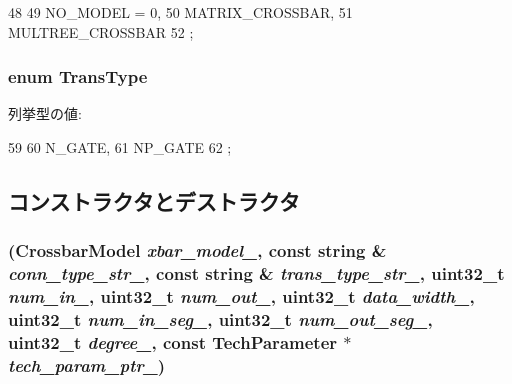 \begin{DoxyCode}
48     {
49       NO_MODEL = 0,
50       MATRIX_CROSSBAR,
51       MULTREE_CROSSBAR
52     };
\end{DoxyCode}
\hypertarget{classCrossbar_acee593b112f4fc85f850631b9c6aaae9}{
\subsubsection[{TransType}]{\setlength{\rightskip}{0pt plus 5cm}enum {\bf TransType}}}
\label{classCrossbar_acee593b112f4fc85f850631b9c6aaae9}
\begin{Desc}
\item[列挙型の値: ]\par
\begin{description}
\item[{\em 
\hypertarget{classCrossbar_acee593b112f4fc85f850631b9c6aaae9a1519be35cfe33e8259c08e59f87358b8}{
N\_\-GATE}
\label{classCrossbar_acee593b112f4fc85f850631b9c6aaae9a1519be35cfe33e8259c08e59f87358b8}
}]\item[{\em 
\hypertarget{classCrossbar_acee593b112f4fc85f850631b9c6aaae9a90021e7e91707771d3c648f4b4c1a1ba}{
NP\_\-GATE}
\label{classCrossbar_acee593b112f4fc85f850631b9c6aaae9a90021e7e91707771d3c648f4b4c1a1ba}
}]\end{description}
\end{Desc}




\begin{DoxyCode}
59     {
60       N_GATE,
61       NP_GATE
62     };
\end{DoxyCode}


\subsection{コンストラクタとデストラクタ}
\hypertarget{classCrossbar_a7173a2d0073951cf449b0487c70479d3}{
\subsubsection[{Crossbar}]{ ({\bf CrossbarModel} {\em xbar\_\-model\_\-}, \/  const string \& {\em conn\_\-type\_\-str\_\-}, \/  const string \& {\em trans\_\-type\_\-str\_\-}, \/  {\bf uint32\_\-t} {\em num\_\-in\_\-}, \/  {\bf uint32\_\-t} {\em num\_\-out\_\-}, \/  {\bf uint32\_\-t} {\em data\_\-width\_\-}, \/  {\bf uint32\_\-t} {\em num\_\-in\_\-seg\_\-}, \/  {\bf uint32\_\-t} {\em num\_\-out\_\-seg\_\-}, \/  {\bf uint32\_\-t} {\em degree\_\-}, \/  const {\bf TechParameter} $\ast$ {\em tech\_\-param\_\-ptr\_\-})}}
\label{classCrossbar_a7173a2d0073951cf449b0487c70479d3}



